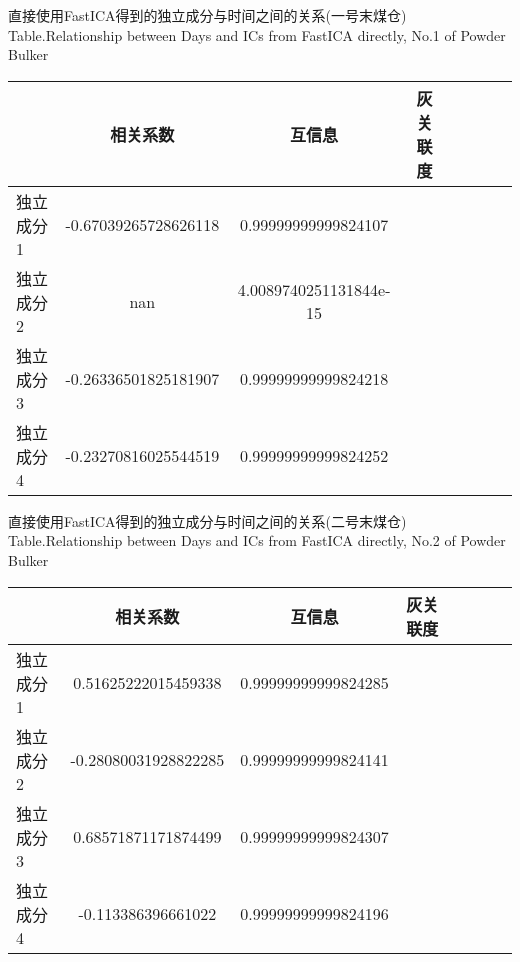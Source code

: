 \begin{table}[!htb]
\begin{center}
		{直接使用FastICA得到的独立成分与时间之间的关系(一号末煤仓)}
			{Table.}{Relationship between Days and ICs from FastICA directly, No.1 of Powder Bulker}
\begin{tabular}{lccclccc}
\toprule
                		& 相关系数     					& 互信息      					&灰关联度 \\
\midrule
  独立成分1     	&  -0.67039265728626118     		& 0.99999999999824107   	&    \\
  独立成分2     	&  nan          						& 4.0089740251131844e-15   	&    \\
  独立成分3     	&  -0.26336501825181907      		& 0.99999999999824218   	&    \\
  独立成分4     	&  -0.23270816025544519      		& 0.99999999999824252  	&    \\
 \bottomrule
\end{tabular}
\end{center}
\end{table}

\begin{table}[!htb]
\begin{center}
		{直接使用FastICA得到的独立成分与时间之间的关系(二号末煤仓)}
			{Table.}{Relationship between Days and ICs from FastICA directly, No.2 of Powder Bulker}
\begin{tabular}{lccclccc}
\toprule
                		& 相关系数     					& 互信息      					&灰关联度 \\
\midrule
  独立成分1     	&  0.51625222015459338     		& 0.99999999999824285   	&    \\
  独立成分2     	&  -0.28080031928822285		& 0.99999999999824141   	&    \\
  独立成分3     	&  0.68571871171874499      		& 0.99999999999824307   	&    \\
  独立成分4     	&  -0.113386396661022      		& 0.99999999999824196  	&    \\
 \bottomrule
\end{tabular}
\end{center}
\end{table}

